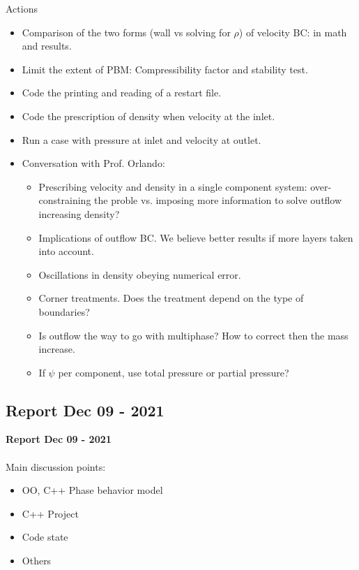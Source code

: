 \documentclass{beamer}
\begin{document}
	\begin{frame}{Actions}
		\begin{itemize}
			\item Comparison of the two forms (wall vs solving for $\rho$) of velocity BC: in math and results.
			\item Limit the extent of PBM: Compressibility factor and stability test.
			\item Code the printing and reading of a restart file.
			\item Code the prescription of density when velocity at the inlet.
			\item Run a case with pressure at inlet and velocity at outlet.
			\item Conversation with Prof. Orlando:
			\begin{itemize}
				\item Prescribing velocity and density in a single component system: over-constraining the proble vs. imposing more information to solve outflow increasing density?
				\item Implications of outflow BC. We believe better results if more layers taken into account.
				\item Oscillations in density obeying numerical error.
				\item Corner treatments. Does the treatment depend on the type of boundaries?
				\item Is outflow the way to go with multiphase? How to correct then the mass increase.
				\item If $\psi$ per component, use total pressure or partial pressure?
			\end{itemize}
		\end{itemize}
	\end{frame}
	\subsection{Report Dec 09 - 2021}
	\justifying
	\begin{frame}
		\textbf{Report Dec 09 - 2021}\\~\\
		Main discussion points:
		\begin{itemize}
			\item OO, C++ Phase behavior model
			\item C++ Project
			\item Code state
			\item Others
		\end{itemize}
	\end{frame}
	
\end{document}
